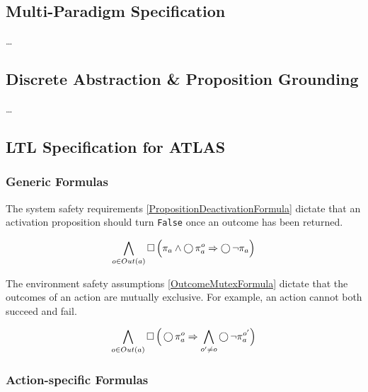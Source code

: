 
\subsection{Multi-Paradigm Specification}

\ldots

\subsection{Discrete Abstraction \& Proposition Grounding}

\ldots

\subsection{LTL Specification for ATLAS}

\subsubsection{Generic Formulas}

The system safety requirements \eqref{PropositionDeactivationFormula} dictate that an activation proposition should turn \texttt{False} once an outcome has been returned.

\begin{equation}\label{PropositionDeactivationFormula}
	\bigwedge \limits_{o \in Out(a)} \operatorname{\Box} \Big( \pi_a \wedge \operatorname{\bigcirc} \pi_a^o \Rightarrow \operatorname{\bigcirc} \lnot \pi_a \Big)
\end{equation}

The environment safety assumptions \eqref{OutcomeMutexFormula} dictate that the outcomes of an action are mutually exclusive. 
For example, an action cannot both succeed and fail.

\begin{equation}\label{OutcomeMutexFormula}
	\bigwedge \limits_{o \in Out(a)} \operatorname{\Box} \Big( \operatorname{\bigcirc} \pi_a^o \Rightarrow \bigwedge \limits_{o^\prime \neq o} \operatorname{\bigcirc} \lnot \pi_a^{o^\prime} \Big)
\end{equation}


\subsubsection{Action-specific Formulas}

